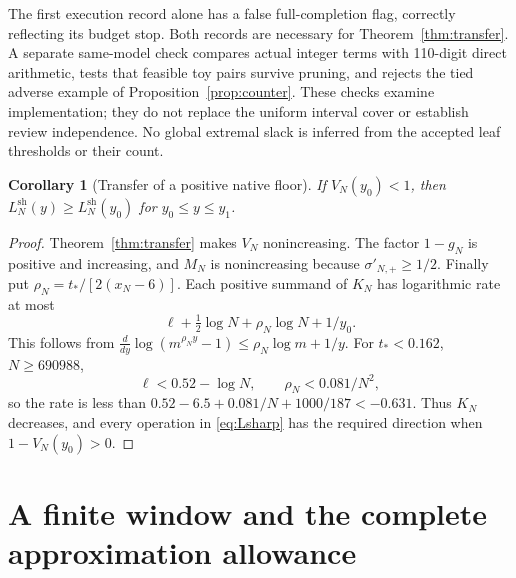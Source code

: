 \documentclass[11pt]{article}
\newtheorem{corollary}[theorem]{Corollary}
\theoremstyle{remark}
\newcommand{\tstar}{t_*}
\newcommand{\Lsharp}{L_N^{\mathrm{sh}}}
\numberwithin{equation}{section}
\begin{document}
The first execution record alone has a false full-completion flag,
correctly reflecting its budget stop. Both records are necessary for
Theorem~\ref{thm:transfer}. A separate same-model check compares actual
integer terms with 110-digit direct arithmetic, tests that feasible toy
pairs survive pruning, and rejects the tied adverse example of
Proposition~\ref{prop:counter}. These checks examine implementation;
they do not replace the uniform interval cover or establish review
independence. No global extremal slack is inferred from the accepted
leaf thresholds or their count.

\begin{corollary}[Transfer of a positive native floor]\label{cor:floor}
If $V_N(y_0)<1$, then $\Lsharp(y)\ge\Lsharp(y_0)$ for
$y_0\le y\le y_1$.
\end{corollary}
\begin{proof}
Theorem~\ref{thm:transfer} makes $V_N$ nonincreasing. The factor $1-g_N$
is positive and increasing, and $M_N$ is nonincreasing because
$\sigma'_{N,+}\ge1/2$. Finally put $\rho_N=\tstar/[2(x_N-6)]$.
Each positive summand of $K_N$ has logarithmic rate at most
\[
 \ell+\tfrac12\log N+\rho_N\log N+1/y_0.
\]
This follows from
$\frac{d}{dy}\log(m^{\rho_Ny}-1)\le\rho_N\log m+1/y$.
For $\tstar<0.162$, $N\ge690988$,
\[
 \ell<0.52-\log N,\qquad \rho_N<0.081/N^2,
\]
so the rate is less than
$0.52-6.5+0.081/N+1000/187<-0.631$.
Thus $K_N$ decreases, and every operation in \eqref{eq:Lsharp} has
the required direction when $1-V_N(y_0)>0$.
\end{proof}

\section{A finite window and the complete approximation allowance}\label{sec:pilot}
\end{document}
